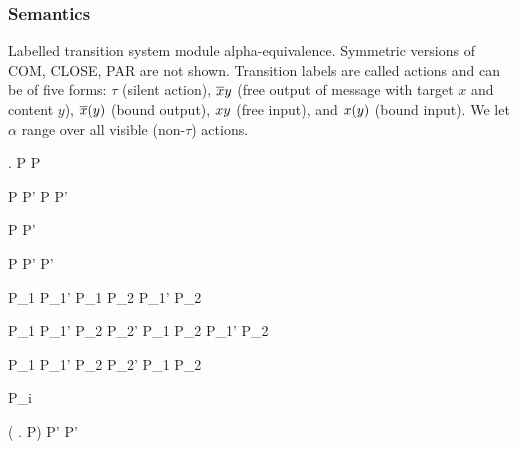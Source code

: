 \subsubsection{Semantics}

Labelled transition system module alpha-equivalence.
Symmetric versions of COM, CLOSE, PAR are not shown.
Transition labels are called actions and can be of five forms:
$\tau$ (silent action),
$\overline{x}y$ (free output of message with target $x$ and content $y$),
$\overline{x}(y)$ (bound output),
$xy$ (free input),
and $x(y)$ (bound input).
We let $\alpha$ range over all visible (non-$\tau$) actions.

  {  \anullproc}

  { . P  P}

  {P  P'}
  {P  P'}

  {P \apireduction{\alpha} P'}
  { \apireduction{\alpha} }

  {P  P'}
  {  P'}

  {P_1 \apireduction{\alpha} P_1'}
  {P_1 \apar P_2 \apireduction{\alpha} P_1' \apar P_2}

  {P_1  P_1'}
  {P_2  P_2'}
  {P_1 \apar P_2 \apireduction{\actsilent} P_1' \apar P_2}

  {P_1  P_1'}
  {P_2  P_2'}
  {P_1 \apar P_2 \apireduction{\actsilent} }

  { \apireduction{\actsilent} P_i}

  {( . P)
    \apireduction{\alpha} P'}
  { \apireduction{\alpha} P'}



